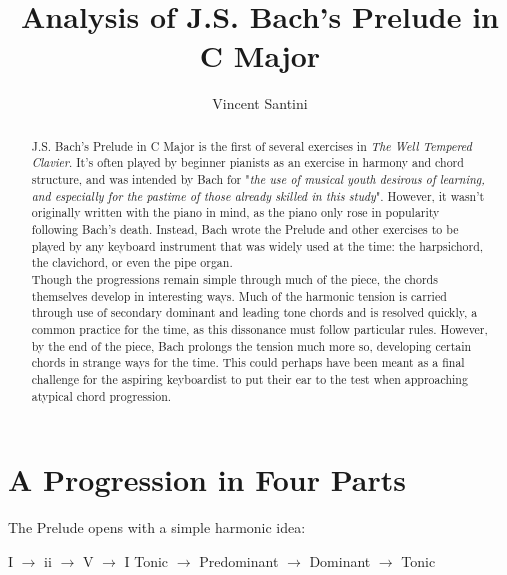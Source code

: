 \documentclass[a4paper,12pt]{report}
\title{Analysis of J.S. Bach's Prelude in C Major}
\author{Vincent Santini}
\begin{document}
\maketitle

\begin{abstract}
\doublespacing
J.S. Bach's Prelude in C Major is the first of several exercises in \textit{The Well Tempered Clavier}. It's often played by beginner pianists as an exercise in harmony and chord structure, and was intended by Bach for "\textit{the use of musical youth desirous of learning, and especially for the pastime of those already skilled in this study}". However, it wasn't originally written with the piano in mind, as the piano only rose in popularity following Bach's death. Instead, Bach wrote the Prelude and other exercises to be played by any keyboard instrument that was widely used at the time: the harpsichord, the clavichord, or even the pipe organ.\\
\indent Though the progressions remain simple through much of the piece, the chords themselves develop in interesting ways. Much of the harmonic tension is carried through use of secondary dominant and leading tone chords and is resolved quickly, a common practice for the time, as this dissonance must follow particular rules. However, by the end of the piece, Bach prolongs the tension much more so, developing certain chords in strange ways for the time. This could perhaps have been meant as a final challenge for the aspiring keyboardist to put their ear to the test when approaching atypical chord progression.
\end{abstract}


\section*{A Progression in Four Parts}
\doublespacing
The Prelude opens with a simple harmonic idea:
\begin{center}
I $\rightarrow$ ii $\rightarrow$ V $\rightarrow$ I \linebreak
Tonic $\rightarrow$ Predominant $\rightarrow$ Dominant $\rightarrow$ Tonic
\end{center}
\end{document}
